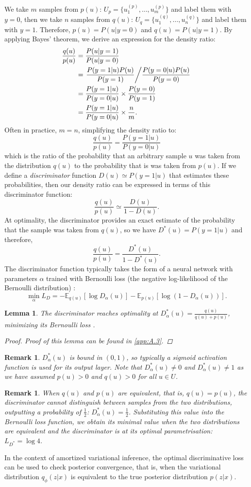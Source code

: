 \documentclass[honours,12pt]{unswthesis}
\newcommand{\E}{\mathbb{E}}
\newtheorem{lemma}[theorem]{Lemma}
\newtheorem{remark}[theorem]{Remark}
\numberwithin{equation}{section}
\theoremstyle{definition}
\begin{document}
We take $m$ samples from $p(u)$: $U_p=\{u_1^{(p)},\dots,u_m^{(p)}\}$
and label them with $y=0$, then we take $n$ samples from $q(u)$: $U_q=\{u_1^{(q)},\dots, u_n^{(q)}\}$ and label them with $y=1$. Therefore, $p(u)=P(u|y=0)$ and $q(u)=P(u|y=1)$. By applying Bayes' theorem, we derive an expression for the density ratio:
\begin{align*}
\frac{q(u)}{p(u)}&= \frac{P(u|y=1)}{P(u|y=0)}\\
&= \left.\frac{P(y=1|u)P(u)}{P(y=1)}\middle/ \frac{P(y=0|u)P(u)}{P(y=0)}\right.\\
&= \frac{P(y=1|u)}{P(y=0|u)}\times \frac{P(y=0)}{P(y=1)}\\
&= \frac{P(y=1|u)}{P(y=0|u)}\times \frac{n}{m}.
\end{align*}
Often in practice, $m=n$, simplifying the density ratio to:
\[\frac{q(u)}{p(u)}=\frac{P(y=1|u)}{P(y=0|u)}\]
which is the ratio of the probability that an arbitrary sample $u$ was taken from the distribution $q(u)$ to the probability that is was taken from $p(u)$. If we define a \textit{discriminator} function $D(u)\simeq P(y=1|u)$ that estimates these probabilities, then our density ratio can be expressed in terms of this discriminator function:
\[\frac{q(u)}{p(u)}\simeq \frac{D(u)}{1-D(u)}.\]
At optimality, the discriminator provides an exact estimate of the probability that the sample was taken from $q(u)$, so we have $D^*(u)=P(y=1|u)$ and therefore,
\[\frac{q(u)}{p(u)}=\frac{D^*(u)}{1-D^*(u)}.\]
The discriminator function typically takes the form of a neural network with parameters $\alpha$ trained with Bernoulli loss (the negative log-likelihood of the Bernoulli distribution) \citep{sugiyama}:
\[\min_\alpha L_D=-\E_{q(u)}[\log D_\alpha(u)]-\E_{p(u)}[\log(1-D_\alpha(u))].\]
\begin{lemma}
The discriminator reaches optimality at $D^*_\alpha(u)=\frac{q(u)}{q(u)+p(u)}$, minimizing its Bernoulli loss \citep{gan}.
\begin{proof}
Proof of this lemma can be found in \autoref{app:A.3}.
\end{proof}
\end{lemma}
\begin{remark}\label{rem:4.1.2}
$D^*_\alpha(u)$ is bound in $(0,1)$, so typically a sigmoid activation function is used for its output layer. Note that $D^*_\alpha (u)\neq 0$ and $D^*_\alpha(u)\neq 1$ as we have assumed $p(u)>0$ and $q(u)>0$ for all $u\in U$.
\end{remark}
\begin{remark}\label{rem:4.1.3}
When $q(u)$ and $p(u)$ are equivalent, that is, $q(u)=p(u)$, the discriminator cannot distinguish between samples from the two distributions, outputting a probability of $\frac{1}{2}$: $D^*_\alpha(u)=\frac{1}{2}$. Substituting this value into the Bernoulli loss function, we obtain its minimal value when the two distributions are equivalent and the discriminator is at its optimal parametrisation: $L_{D^*}=\log 4$.
\end{remark}
In the context of amortized variational inference, the optimal discriminative loss can be used to check posterior convergence, that is, when the variational distribution $q_\phi(z|x)$ is equivalent to the true posterior distribution $p(z|x)$.
\end{document}
